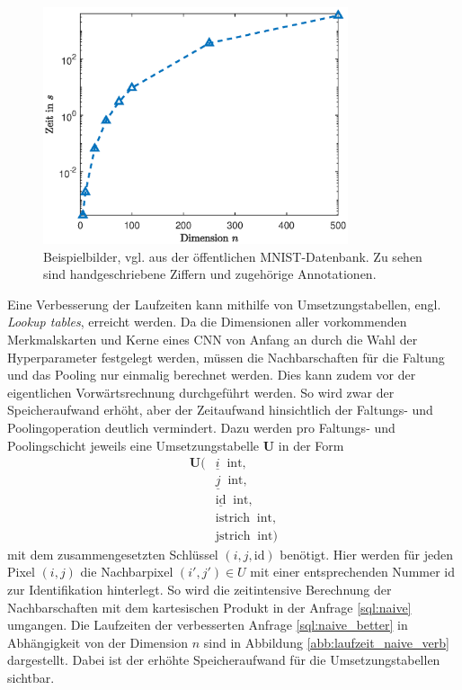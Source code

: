 \begin{figure}[h]
    \includegraphics[width=0.8\textwidth]{pics/chapters/kap5/data_plot_naive_verb.eps}
    \centering
    \caption{Beispielbilder, vgl. \cite{DBLP:journals/pieee/LeCunBBH98} aus der öffentlichen MNIST-Datenbank. Zu sehen sind handgeschriebene Ziffern und zugehörige Annotationen.}
    \label{mnistpicc}
\end{figure}

Eine Verbesserung der Laufzeiten kann mithilfe von Umsetzungstabellen, engl. \textit{Lookup tables}, erreicht werden. Da die Dimensionen aller vorkommenden Merkmalskarten und Kerne eines CNN von Anfang an durch die Wahl der Hyperparameter festgelegt werden, müssen die Nachbarschaften für die Faltung und das Pooling nur einmalig berechnet werden. Dies kann zudem vor der eigentlichen Vorwärtsrechnung durchgeführt werden. So wird zwar der Speicheraufwand erhöht, aber der Zeitaufwand hinsichtlich der Faltungs- und Poolingoperation deutlich vermindert. Dazu werden pro Faltungs- und Poolingschicht jeweils eine Umsetzungstabelle \textbf{U} in der Form 
\begin{align*}
    \mathbf{U}( &\underline{i} \; \; \mathrm{int}, \\
    &\underline{j} \; \;\mathrm{int},\\
    &\underline{\text{id}} \; \; \mathrm{int}, \\
    &\text{istrich} \; \; \mathrm{int},\\
    &\text{jstrich}\; \; \mathrm{int})
\end{align*}
mit dem zusammengesetzten Schlüssel $(i,j,\text{id})$ benötigt. Hier werden für jeden Pixel $(i,j)$ die Nachbarpixel $(i', j') \in U$ mit einer entsprechenden Nummer $\text{id}$ zur Identifikation  hinterlegt. So wird die zeitintensive Berechnung der Nachbarschaften mit dem  kartesischen Produkt in der Anfrage \ref{sql:naive} umgangen. Die Laufzeiten der verbesserten Anfrage \ref{sql:naive_better} in Abhängigkeit von der Dimension $n$ sind in Abbildung \ref{abb:laufzeit_naive_verb} dargestellt. Dabei ist der erhöhte Speicheraufwand für die Umsetzungstabellen sichtbar.

